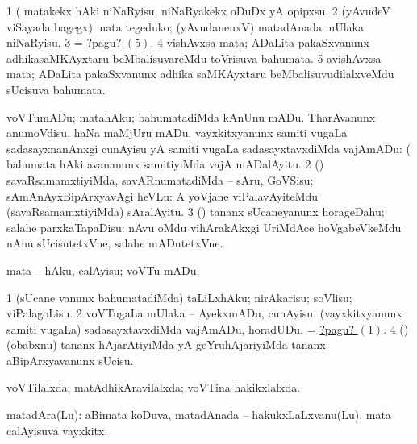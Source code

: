 \noindent 
\gl{\pagu}
\expl{}
\bmng
\bnum
\num{1}  (  matakekx hAki niNaRyisu, niNaRyakekx oDuDx yA opipxsu. 
\num{2}  (yAvudeV viSayada bagegx) mata tegeduko; (yAvudanenxV) matadAnada mUlaka niNaRyisu. 
\num{3}  = \hyperlink{vote1 pagu5}{?pagu? \((5)\)}. 
\num{4}  vishAvxsa mata; ADaLita pakaSxvanunx adhikasaMKAyxtaru beMbalisuvareMdu toVrisuva bahumata. 
\hypertarget{vote1 pagu5}{} 
\num{5}  avishAvxsa mata; ADaLita pakaSxvanunx adhika saMKAyxtaru beMbalisuvudilalxveMdu sUcisuva bahumata. 
\enum
\emng
\eentry

\bentry
{} 
\gl{\sakirx}
\expl{}
\bmng
\bnum
{} voVTumADu; matahAku; bahumatadiMda 
\banum
{} kAnUnu mADu. 
 TharAvanunx anumoVdisu. 
 haNa maMjUru mADu. 
 vayxkitxyanunx samiti \mo vugaLa sadasayxnanAnxgi cunAyisu yA samiti \mo vugaLa sadasayxtavxdiMda vajAmADu:  (  bahumata hAki avananunx samitiyiMda vajA mADalAyitu. 
\eanum
\numie
\num{2} (\AmA) savaRsamamxtiyiMda, savARnumatadiMda -- sAru, GoVSisu; sAmAnAyxBipArxyavAgi heVLu:  A yoVjane viPalavAyiteMdu (savaRsamamxtiyiMda) sAralAyitu. 
\num{3} (\AmA) tananx sUcaneyanunx horageDahu; salahe parxkaTapaDisu:  nAvu oMdu vihArakAkxgi UriMdAce hoVgabeVkeMdu nAnu sUcisutetxVne, salahe mADutetxVne. 
\enum
\emng

\noindent 
\gl{\akirx}
\expl{}
\bmng
mata -- hAku, calAyisu; voVTu mADu. 
\emng

\noindent 
\gl{\pagu}
\expl{}
\bmng
\hypertarget{vote2 pagu1}{} 
\bnum
\num{1}  (sUcane \mo vanunx bahumatadiMda) taLiLxhAku; nirAkarisu; soVlisu; viPalagoLisu. 
\num{2}  voVTugaLa mUlaka -- AyekxmADu, cunAyisu. 
  
\banum
{} (vayxkitxyanunx samiti \mo vugaLa) sadasayxtavxdiMda vajAmADu, horadUDu. 
 = \hyperlink{vote2 pagu1}{?pagu? \((1)\)}. 
\eanum
\numie
\num{4}  (\AmA) (obabxnu) tananx hAjarAtiyiMda yA geYruhAjariyiMda tananx aBipArxyavanunx sUcisu. 
\enum
\emng
\eentry

\bentry
{} 
\gl{\gu}
\expl{}
\bmng
 voVTilalxda; matAdhikAravilalxda; voVTina hakikxlalxda. 
\emng
\eentry

\bentry
{} 
\gl{\nA}
\expl{}
\bmng
 matadAra(Lu): 
\banum
{} aBimata koDuva, matadAnada -- hakukxLaLxvanu(Lu). 
 mata calAyisuva vayxkitx. 
\eanum
\emng
\eentry

